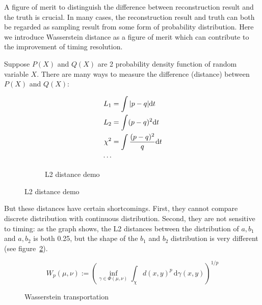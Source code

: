 A figure of merit to distinguish the difference between reconstruction result and the truth is crucial. In many cases, the reconstruction result and truth can both be regarded as sampling result from some form of probability distribution. Here we introduce Wasserstein distance as a figure of merit which can contribute to the improvement of timing resolution. 

Suppose $P(X)$ and $Q(X)$ are 2 probability density function of random variable $X$. There are many ways to measure the difference (distance) between $P(X)$ and $Q(X)$: 

\begin{figure}[H]
\begin{minipage}{.25\textwidth}
\begin{align*}
    L_{1} &= \int|p-q| \mathrm{d} t \\
    L_{2} &= \int(p-q)^{2} \mathrm{d} t \\
    \chi^{2} &= \int\frac{(p-q)^{2}}{q} \mathrm{d} t \\
    \cdots
\end{align*}
\end{minipage}
\begin{minipage}{.7\textwidth}
\begin{figure}[H]
    \centering
    \scalebox{0.4}{}
    \caption{\label{fig:l2} L2 distance demo}
\end{figure}
\end{minipage}
\end{figure}

But these distances have certain shortcomings. First, they cannot compare discrete distribution with continuous distribution. Second, they are not sensitive to timing: as the graph shows, the L2 distances between the distribution of $a,b_{1}$ and $a,b_{2}$ is both 0.25, but the shape of the $b_{1}$ and $b_{2}$ distribution is very different (see figure~\ref{fig:l2}). 

\label{sub:Wasserstein distance}
    \begin{equation}
        W_{p}(\mu,\nu):=\left(\inf_{\gamma\in\Phi(\mu,\nu)}\int_{\chi}d(x,y)^{p}\,\mathrm{d}\gamma(x,y)\right)^{1/p} \label{eq:w-dist-def}
    \end{equation}
    \begin{figure}[H]
        \centering
        \scalebox{0.4}{}
        \caption{\label{fig:Wasserstein transportation} Wasserstein transportation}
    \end{figure}

